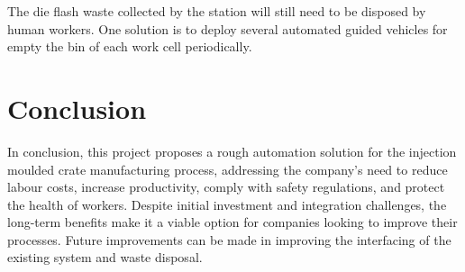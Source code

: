 The die flash waste collected by the station will still need to be disposed by human workers. One solution is to deploy several automated guided vehicles for empty the bin of each work cell periodically.

\section{Conclusion}

In conclusion, this project proposes a rough automation solution for the injection moulded crate manufacturing process, addressing the company's need to reduce labour costs, increase productivity, comply with safety regulations, and protect the health of workers. Despite initial investment and integration challenges, the long-term benefits make it a viable option for companies looking to improve their processes. Future improvements can be made in improving the interfacing of the existing system and waste disposal.
